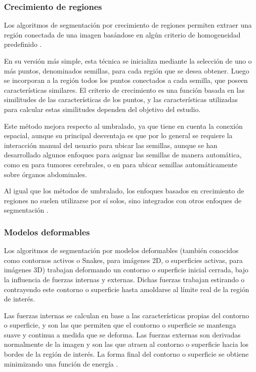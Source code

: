 \subsubsection{Crecimiento de regiones}
Los algoritmos de segmentación por crecimiento de regiones permiten extraer una región conectada de una imagen basándose en algún criterio de homogeneidad predefinido \citep{haralick1985image}.

En su versión más simple, esta técnica se inicializa mediante la selección de uno o más puntos, denominados semillas, para cada región que se desea obtener. Luego se incorporan a la región todos los puntos conectados a cada semilla, que poseen características similares. El criterio de crecimiento es una función basada en las similitudes de las características de los puntos, y las características utilizadas para calcular estas similitudes dependen del objetivo del estudio.

Este método mejora respecto al umbralado, ya que tiene en cuenta la conexión espacial, aunque su principal desventaja es que por lo general se requiere la interacción manual del usuario para ubicar las semillas, aunque se han desarrollado algunos enfoques para asignar las semillas de manera automática, como en \citep{kumar2011texture} para tumores cerebrales, o en \citep{wu2008segmentation} para ubicar semillas automáticamente sobre órganos abdominales.

Al igual que los métodos de umbralado, los enfoques basados en crecimiento de regiones no suelen utilizarse por sí solos, sino integrados con otros enfoques de segmentación \citep{freixenet2002yet}.

\subsubsection{Modelos deformables}
Los algoritmos de segmentación por modelos deformables (también conocidos como contornos activos o Snakes, para imágenes 2D, o superficies activas, para imágenes 3D) trabajan deformando un contorno o superficie inicial cerrada, bajo la influencia de fuerzas internas y externas. Dichas fuerzas trabajan estirando o contrayendo este contorno o superficie hasta amoldarse al límite real de la región de interés.

Las fuerzas internas se calculan en base a las características propias del contorno o superficie, y son las que permiten que el contorno o superficie se mantenga suave y continua a medida que se deforma.  Las fuerzas externas son derivadas normalmente de la imagen y son las que atraen al contorno o superficie hacia los bordes de la región de interés. La forma final del contorno o superficie se obtiene minimizando una función de energía \citep{pham2000current}.

